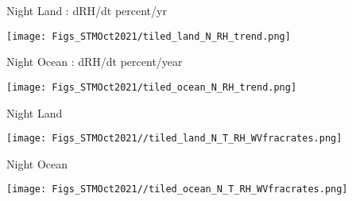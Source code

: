 \documentclass[10pt,t]{beamer}
\begin{document}

\begin{frame}{Night Land : dRH/dt percent/yr}
\begin{center}
\texttt{[image: Figs\_STMOct2021/tiled\_land\_N\_RH\_trend.png]}
\end{center}
\end{frame}

\begin{frame}{Night Ocean : dRH/dt percent/year}
\begin{center}
\texttt{[image: Figs\_STMOct2021/tiled\_ocean\_N\_RH\_trend.png]}
\end{center}
\end{frame}


\begin{frame}{Night Land}
\begin{center}
\texttt{[image: Figs\_STMOct2021//tiled\_land\_N\_T\_RH\_WVfracrates.png]}
\end{center}
\end{frame}

\begin{frame}{Night Ocean}
\begin{center}
\texttt{[image: Figs\_STMOct2021//tiled\_ocean\_N\_T\_RH\_WVfracrates.png]}
\end{center}
\end{frame}

\end{document}
